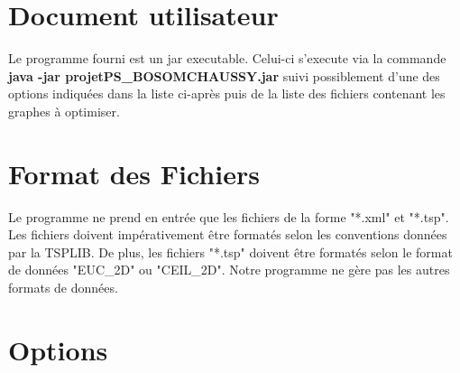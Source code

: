 \documentclass{article}
\begin{document}



\section{Document utilisateur}

Le programme fourni est un jar executable. Celui-ci s'execute via la commande \textbf{java -jar projetPS\_BOSOMCHAUSSY.jar} suivi possiblement d'une des options indiquées dans la liste ci-après puis de la liste des fichiers contenant les graphes à optimiser.

\section*{Format des Fichiers}

Le programme ne prend en entrée que les fichiers de la forme "*.xml" et "*.tsp". Les fichiers doivent impérativement être formatés selon les conventions données par la TSPLIB.
De plus, les fichiers "*.tsp" doivent être formatés selon le format de données "EUC\_2D" ou "CEIL\_2D". Notre programme ne gère pas les autres formats de données.

\section*{Options}
\end{document}
